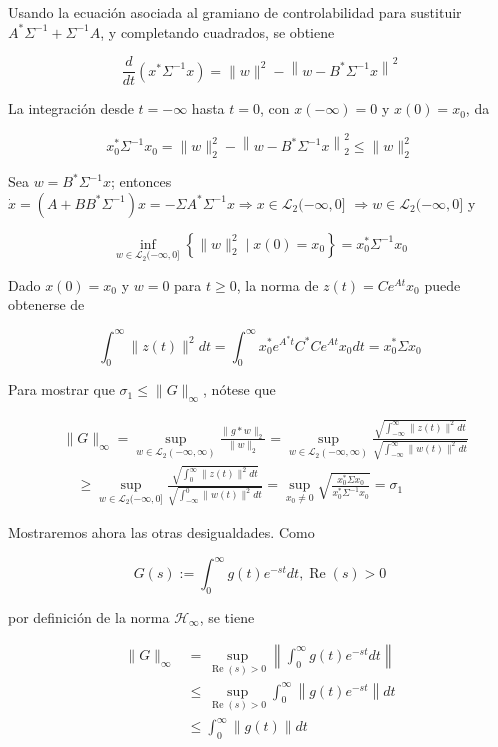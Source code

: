 Usando la ecuación asociada al gramiano de controlabilidad para sustituir $A^{*} \Sigma^{-1}+\Sigma^{-1} A$, y completando cuadrados, se obtiene

$$
\frac{d}{d t}\left(x^{*} \Sigma^{-1} x\right)=\|w\|^{2}-\left\|w-B^{*} \Sigma^{-1} x\right\|^{2}
$$

La integración desde $t=-\infty$ hasta $t=0$, con $x(-\infty)=0$ y $x(0)=x_{0}$, da

$$
x_{0}^{*} \Sigma^{-1} x_{0}=\|w\|_{2}^{2}-\left\|w-B^{*} \Sigma^{-1} x\right\|_{2}^{2} \leq\|w\|_{2}^{2}
$$

Sea $w=B^{*} \Sigma^{-1} x$; entonces $\dot{x}=\left(A+B B^{*} \Sigma^{-1}\right) x=-\Sigma A^{*} \Sigma^{-1} x \Rightarrow x \in \mathcal{L}_{2}(-\infty, 0]$ $\Longrightarrow w \in \mathcal{L}_{2}(-\infty, 0]$ y

$$
\inf _{w \in \mathcal{L}_{2}(-\infty, 0]}\left\{\|w\|_{2}^{2} \mid x(0)=x_{0}\right\}=x_{0}^{*} \Sigma^{-1} x_{0}
$$

Dado $x(0)=x_{0}$ y $w=0$ para $t \geq 0$, la norma de $z(t)=C e^{A t} x_{0}$ puede obtenerse de

$$
\int_{0}^{\infty}\|z(t)\|^{2} d t=\int_{0}^{\infty} x_{0}^{*} e^{A^{*} t} C^{*} C e^{A t} x_{0} d t=x_{0}^{*} \Sigma x_{0}
$$

Para mostrar que $\sigma_{1} \leq\|G\|_{\infty}$, nótese que

$$
\begin{aligned}
& \|G\|_{\infty}=\sup _{w \in \mathcal{L}_{2}(-\infty, \infty)} \frac{\|g * w\|_{2}}{\|w\|_{2}}=\sup _{w \in \mathcal{L}_{2}(-\infty, \infty)} \frac{\sqrt{\int_{-\infty}^{\infty}\|z(t)\|^{2} d t}}{\sqrt{\int_{-\infty}^{\infty}\|w(t)\|^{2} d t}} \\
& \quad \geq \sup _{w \in \mathcal{L}_{2}(-\infty, 0]} \frac{\sqrt{\int_{0}^{\infty}\|z(t)\|^{2} d t}}{\sqrt{\int_{-\infty}^{0}\|w(t)\|^{2} d t}}=\sup _{x_{0} \neq 0} \sqrt{\frac{x_{0}^{*} \Sigma x_{0}}{x_{0}^{*} \Sigma^{-1} x_{0}}}=\sigma_{1}
\end{aligned}
$$

Mostraremos ahora las otras desigualdades. Como

$$
G(s):=\int_{0}^{\infty} g(t) e^{-s t} d t, \operatorname{Re}(s)>0
$$

por definición de la norma $\mathcal{H}_{\infty}$, se tiene

$$
\begin{aligned}
\|G\|_{\infty} & =\sup _{\operatorname{Re}(s)>0}\left\|\int_{0}^{\infty} g(t) e^{-s t} d t\right\| \\
& \leq \sup _{\operatorname{Re}(s)>0} \int_{0}^{\infty}\left\|g(t) e^{-s t}\right\| d t \\
& \leq \int_{0}^{\infty}\|g(t)\| d t
\end{aligned}
$$

